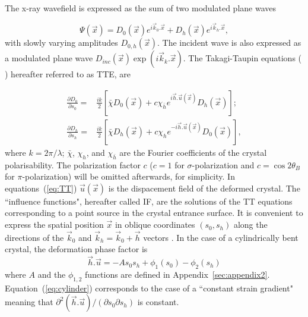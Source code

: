 \documentclass[preprint]{iucr}              %
\newcommand{\inblue}[1]{{\color{blue}#1}}
\begin{document}
The x-ray wavefield is expressed as the sum of two modulated plane waves

\begin{equation}
    \Psi(\vec x) = D_0(\vec x) e^{i \vec k_0 . \vec x} + D_h(\vec x) e^{i \vec k_h . \vec x},
\end{equation}
with slowly varying amplitudes $D_{0,h}(\vec x)$. The incident wave is also expressed as a modulated plane wave $D_{inc}(\vec x) \exp(i\vec k_k . \vec x)$. The Takagi-Taupin equations  (\cite{Takagi} \cite{Takagi1962} \cite{Taupin} \cite{Taupin1967}) hereafter referred to as TTE, are

\begin{equation}
\label{eq:TT}
\begin{aligned}
\frac{\partial D_0}{\partial s_0} =& \frac{ik}{2} \left[ \bar{\chi} D_0(\vec x)+c \chi_{\bar h} e^{i \vec h . \vec u (\vec x)} D_h(\vec x) \right]; \\
\frac{\partial D_h}{\partial s_h} =& \frac{ik}{2} \left[ \bar{\chi} D_h(\vec x)+c \chi_{h} e^{-i \vec h . \vec u (\vec x)} D_0(\vec x) \right],
\end{aligned}
\end{equation}
where $k=2\pi/\lambda$; $\bar \chi$, $\chi_h$, and $\chi_{\bar h}$ are the Fourier coefficients of the crystal polarisability. The \inblue{polarization} factor $c$ ($c=1$ for $\sigma$-polarization and $c=\cos2\theta_B$  for $\pi$-polarization) will be omitted afterwards, for simplicity. 
In equations~(\ref{eq:TT}) $\vec u (\vec x)$ is the dispacement field of the deformed crystal. The ``influence functions", hereafter called IF, are the solutions of the TT equations corresponding to a point source in the crystal entrance surface.
\inblue{It is convenient to express the spatial position $\vec x$ in oblique coordinates $(s_0,s_h)$ along the directions of the $\vec k_0$ and $\vec k_h=\vec k_0 + \vec h$ vectors .}
In the case of a cylindrically bent crystal, the deformation phase factor is
\begin{equation}
\label{eq:cylinder}
    \vec h . \vec u = -A s_0 s_h + \phi_1(s_0) - \phi_2(s_h)
\end{equation}
where $A$ and the $\phi_{1,2}$ functions are defined in Appendix~\ref{sec:appendix2}.
Equation~(\ref{eq:cylinder}) corresponds to the case of a ``constant strain gradient" \cite{authierbook} meaning that $\partial^2(\vec h . \vec u)/(\partial s_0 \partial s_h)$ is constant.
\end{document}
